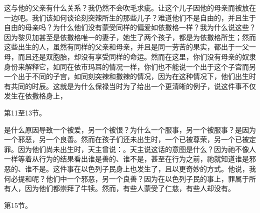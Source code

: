 这与他的父亲有什么关系？我仍然不会吹毛求疵。让这个儿子因他的母亲而被放在一边吧。我们该如何谈论刻突辣所生的那些儿子？难道他们不是自由的，并且生于自由的母亲吗？为什么他们没有蒙受同样的偏爱如依撒格一样？我为什么说这些？因为黎贝加甚至是依撒格唯一的妻子，她生了两个孩子，都是为依撒格所生；然而这些出生的人，虽然有同样的父亲和母亲，并且是同一劳苦的果实，都出于一父一母，而且还是双胞胎，却没有享受同样的命运。然而在这里，你们没有母亲的奴隶身份来解释它，如同在依市玛耳的情况一样，你们也不能说一个出于这个子宫而另一个出于不同的子宫，如同刻突辣和撒辣的情况，因为在这种情况下，他们出生时有共同的时辰。这就是为什么保禄当时为了给出一个更清晰的例子，说这件事不仅发生在依撒格身上，\par

第11至13节。\par

是什么原因导致一个被爱，另一个被恨？为什么一个服事，另一个被服事？是因为一个邪恶，另一个良善。然而在孩子们还未出生时，一个已被尊荣，另一个已被定罪。因为他们尚未出生时，天主曾说：。天主说这话的意图是什么？因为祂不像人一样等着从行为的结果看出谁是善的、谁不是，甚至在行为之前，祂就知道谁是邪恶的、谁不是。这件事在以色列子民身上也发生了，且以更奇妙的方式。他说，我何必提和呢？他们中一个邪恶，另一个良善？因为在以色列子民的事上，罪属于所有人，因为他们都崇拜了牛犊。然而，有些人蒙受了仁慈，有些人却没有。\par

第15节。\par

